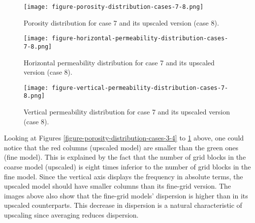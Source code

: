 %
\begin{figure}[H]
	\centering
	\texttt{[image: figure-porosity-distribution-cases-7-8.png]}
	\caption{Porosity distribution for case 7 and its upscaled version (case 8).}
\end{figure}
%
\begin{figure}[H]
	\centering
	\texttt{[image: figure-horizontal-permeability-distribution-cases-7-8.png]}
	\caption{Horizontal permeability distribution for case 7 and its upscaled version (case 8).}
\end{figure}
%
\begin{figure}[H]
	\centering
	\texttt{[image: figure-vertical-permeability-distribution-cases-7-8.png]}
	\caption{Vertical permeability distribution for case 7 and its upscaled version (case 8).}
	\label{figure-vertical-permeability-distribution-cases-7-8}
\end{figure}
%
Looking at Figures \ref{figure-porosity-distribution-cases-3-4} to \ref{figure-vertical-permeability-distribution-cases-7-8} above, one could notice that the red columns (upscaled model) are smaller than the green ones (fine model). 
%
This is explained by the fact that the number of grid blocks in the coarse model (upscaled) is eight times inferior to the number of grid blocks in the fine model. 
%
Since the vertical axis displays the frequency in absolute terms, the upscaled model should have smaller columns than its fine-grid version. 
%
The images above also show that the fine-grid models' dispersion is higher than in its upscaled counterparts.
%
This decrease in dispersion is a natural characteristic of upscaling since averaging reduces dispersion.